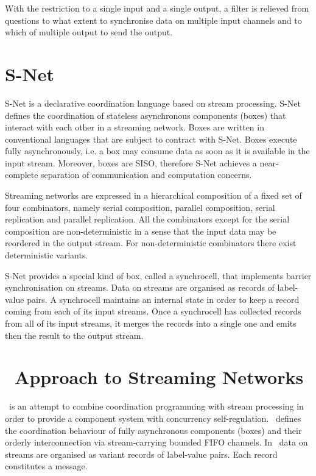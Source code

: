 With the restriction to a single input and a single output, a filter is relieved from questions to what extent to synchronise data on multiple input channels and to which of multiple output to send the output.


    \section{S-Net}
S-Net \cite{snet_intro} is a declarative coordination language based on stream processing. S-Net defines the coordination of stateless asynchronous components (boxes) that interact with each other in a streaming network. Boxes are written in conventional languages that are subject to contract with S-Net. Boxes execute fully asynchronously, i.e. a box may consume data as soon as it is available in the input stream. Moreover, boxes are SISO, therefore S-Net achieves a near-complete separation of communication and computation concerns.

Streaming networks are expressed in a hierarchical composition of a fixed set of four combinators, namely serial composition, parallel composition, serial replication and parallel replication. All the combinators except for the serial composition are non-deterministic in a sense that the input data may be reordered in the output stream. For non-deterministic combinators there exist deterministic variants.

S-Net provides a special kind of box, called a synchrocell, that implements barrier synchronisation on streams. Data on streams are organised as records of label-value pairs. A synchrocell maintains an internal state in order to keep a record coming from each of its input streams. Once a synchrocell has collected records from all of its input streams, it merges the records into a single one and emits then the result to the output stream.


    \section{\ak\ Approach to Streaming Networks}
\ak\ is an attempt to combine coordination programming with stream processing in order to provide a component system with concurrency self-regulation. \ak\ defines the coordination behaviour of fully asynchronous components (boxes) and their orderly interconnection via stream-carrying bounded FIFO channels. In \ak\, data on streams are organised as variant records of label-value pairs. Each record constitutes a message.

